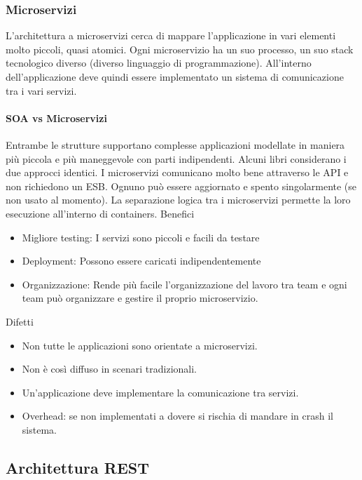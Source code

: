 \documentclass{article}
\begin{document}
		\subsubsection{Microservizi}
		L'architettura a microservizi cerca di mappare l'applicazione in vari elementi molto piccoli, quasi atomici.
		Ogni microservizio ha un suo processo, un suo stack tecnologico diverso (diverso linguaggio di programmazione). All'interno dell'applicazione deve quindi essere implementato un sistema di comunicazione tra i vari servizi.
		
		\paragraph{SOA vs Microservizi}
		Entrambe le strutture supportano complesse applicazioni modellate in maniera più piccola e più maneggevole con parti indipendenti. Alcuni libri considerano i due approcci identici.
		I microservizi comunicano molto bene attraverso le API e non richiedono un ESB. Ognuno può essere aggiornato e spento singolarmente (se non usato al momento).
		La separazione logica tra i microservizi permette la loro esecuzione all'interno di containers.
		\newline \newline
		Benefici
		\begin{itemize}
		    \item Migliore testing: I servizi sono piccoli e facili da testare
		    \item Deployment: Possono essere caricati indipendentemente
		    \item Organizzazione: Rende più facile l'organizzazione del lavoro tra team e ogni team può organizzare e gestire il proprio microservizio. 
		\end{itemize}
		Difetti
		\begin{itemize}
		    \item Non tutte le applicazioni sono orientate a microservizi.
		    \item Non è così diffuso in scenari tradizionali.
		    \item Un'applicazione deve implementare la comunicazione tra servizi.
		    \item Overhead: se non implementati a dovere si rischia di mandare in crash il sistema.
		\end{itemize}
		
		\subsection{Architettura REST}
\end{document}
